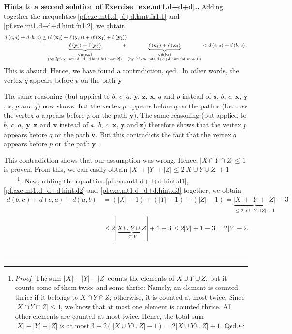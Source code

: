 \documentclass[numbers=enddot,12pt,final,onecolumn,notitlepage]{scrartcl}%
\theoremstyle{definition}
\newenvironment{proof}[1][Proof]{\noindent\textbf{#1.} }{\ \rule{0.5em}{0.5em}}
\newcommand{\abs}[1]{\left| #1 \right|}
\newcommand{\tup}[1]{\left( #1 \right)}
\begin{document}
\begin{proof}[Hints to a second solution of Exercise~\ref{exe.mt1.d+d+d}.]
{Adding together the inequalities \eqref{pf.exe.mt1.d+d+d.hint.fn1.1}
and \eqref{pf.exe.mt1.d+d+d.hint.fn1.2}, we obtain
\begin{align*}
d \tup{c, a} + d \tup{b, c}
&\leq \tup{\ell\tup{\mathbf{x}_3} + \ell\tup{\mathbf{y}_3}}
      + \tup{\ell\tup{\mathbf{x}_1} + \ell\tup{\mathbf{y}_1}} \\
&=
  \underbrace{ \ell\tup{\mathbf{y}_1}
               + \ell\tup{\mathbf{y}_3} }
             _{\substack{< d\tup{c, a} \\
                 \text{(by \eqref{pf.exe.mt1.d+d+d.hint.fn1.more2})}}}
+ \underbrace{ \ell\tup{\mathbf{x}_1}
               + \ell\tup{\mathbf{x}_3} }
             _{\substack{< d\tup{b, c} \\
                 \text{(by \eqref{pf.exe.mt1.d+d+d.hint.fn1.more1})}}}
< d \tup{c, a} + d \tup{b, c}.
\end{align*}
This is absurd. Hence, we have found a contradiction, qed.}.
In other words, the vertex $q$ appears before $p$ on the path
$\mathbf{y}$.

The same reasoning (but applied to $b$, $c$, $a$, $\mathbf{y}$,
$\mathbf{z}$, $\mathbf{x}$, $q$ and $p$ instead of $a$, $b$, $c$,
$\mathbf{x}$, $\mathbf{y}$, $\mathbf{z}$, $p$ and $q$) now shows that
the vertex $p$ appears before $q$ on the path $\mathbf{z}$ (because
the vertex $q$ appears before $p$ on the path $\mathbf{y}$).
The same reasoning (but applied to $b$, $c$, $a$, $\mathbf{y}$,
$\mathbf{z}$ and $\mathbf{x}$ instead of $a$, $b$, $c$,
$\mathbf{x}$, $\mathbf{y}$ and $\mathbf{z}$) therefore shows that
the vertex $p$ appears before $q$ on the path $\mathbf{y}$.
But this contradicts the fact that the vertex $q$ appears before
$p$ on the path $\mathbf{y}$.

This contradiction shows that our assumption was wrong. Hence,
$\abs{X \cap Y \cap Z} \leq 1$ is proven. From this, we can easily
obtain $\abs{X} + \abs{Y} + \abs{Z} \leq 2 \abs{X \cup Y \cup Z} + 1$
\ \ \ \ \footnote{\textit{Proof.} The sum
$\abs{X} + \abs{Y} + \abs{Z}$ counts the elements of
$X \cup Y \cup Z$, but it counts some of them twice and some thrice:
Namely, an element is counted thrice if it belongs to
$X \cap Y \cap Z$; otherwise, it is counted at most twice. Since
$\abs{X \cap Y \cap Z} \leq 1$, we know that at most one element is
counted thrice. All other elements are counted at most twice. Hence,
the total sum $\abs{X} + \abs{Y} + \abs{Z}$ is at most
$3 + 2 \tup{\abs{X \cup Y \cup Z} - 1} = 2 \abs{X \cup Y \cup Z} + 1$.
Qed.}. Now, adding the equalities
\eqref{pf.exe.mt1.d+d+d.hint.d1}, \eqref{pf.exe.mt1.d+d+d.hint.d2}
and \eqref{pf.exe.mt1.d+d+d.hint.d3} together, we obtain
\begin{align*}
d \tup{b, c} + d \tup{c, a} + d \tup{a, b}
&= \tup{\abs{X} - 1} + \tup{\abs{Y} - 1} + \tup{\abs{Z} - 1}
= \underbrace{\abs{X} + \abs{Y} + \abs{Z}}
             _{\leq 2 \abs{X \cup Y \cup Z} + 1}
  -\, 3 \\
&\leq 2 \abs{\underbrace{X \cup Y \cup Z}_{\subseteq V}} + 1 - 3
\leq 2 \abs{V} + 1 - 3 = 2 \abs{V} - 2.
\end{align*}
\end{proof}
\end{document}
